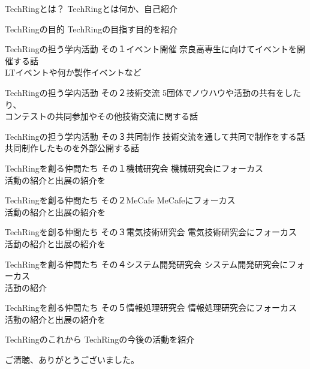 \documentclass[dvipdfmx]{beamer}
\begin{document}
\begin{frame}{TechRingとは？}
  TechRingとは何か、自己紹介
\end{frame}

\begin{frame}{TechRingの目的}
  TechRingの目指す目的を紹介
\end{frame}

\begin{frame}{TechRingの担う学内活動 その１}{イベント開催}
  奈良高専生に向けてイベントを開催する話\\
  LTイベントや何か製作イベントなど
\end{frame}

\begin{frame}{TechRingの担う学内活動 その２}{技術交流}
  5団体でノウハウや活動の共有をしたり、\\
  コンテストの共同参加やその他技術交流に関する話
\end{frame}

\begin{frame}{TechRingの担う学内活動 その３}{共同制作}
  技術交流を通して共同で制作をする話\\
  共同制作したものを外部公開する話
\end{frame}

\begin{frame}{TechRingを創る仲間たち その１}{機械研究会}
  機械研究会にフォーカス\\
  活動の紹介と出展の紹介を
\end{frame}

\begin{frame}{TechRingを創る仲間たち その２}{MeCafe}
  MeCafeにフォーカス\\
  活動の紹介と出展の紹介を
\end{frame}

\begin{frame}{TechRingを創る仲間たち その３}{電気技術研究会}
  電気技術研究会にフォーカス\\
  活動の紹介と出展の紹介を
\end{frame}

\begin{frame}{TechRingを創る仲間たち その４}{システム開発研究会}
  システム開発研究会にフォーカス\\
  活動の紹介
\end{frame}

\begin{frame}{TechRingを創る仲間たち その５}{情報処理研究会}
  情報処理研究会にフォーカス\\
  活動の紹介と出展の紹介を
\end{frame}

\begin{frame}{TechRingのこれから}
  TechRingの今後の活動を紹介
\end{frame}

\begin{frame}
  \begin{Large}
    ご清聴、ありがとうございました。
  \end{Large}
\end{frame}
\end{document}
